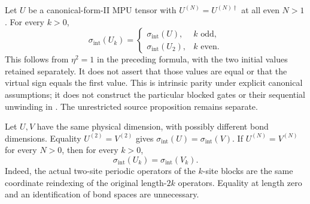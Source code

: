 \begin{lemma}
    \label{lem:mpu_canonical_intrinsic_blocking_parity}
    \leanok
    Let $U$ be a canonical-form-II MPU tensor with
    $U^{(N)}=U^{(N)\dagger}$ at all even $N>1$. For every $k>0$,
    \[
        \sigma_{\mathrm{int}}(U_k)=
        \begin{cases}
            \sigma_{\mathrm{int}}(U),   & k\text{ odd},  \\
            \sigma_{\mathrm{int}}(U_2), & k\text{ even}.
        \end{cases}
    \]
    This follows from $\eta^2=1$ in the preceding formula, with the two
    initial values retained separately. It does not assert that those
    values are equal or that the virtual sign equals the first value.
    This is intrinsic parity under explicit canonical assumptions; it does
    not construct the particular blocked gates or their sequential
    unwinding in \cite[lines~1643--1733]{Cirac2017MPU}. The unrestricted
    source proposition remains separate.
\end{lemma}

\begin{lemma}
    \label{lem:mpu_intrinsic_blocked_trace_representative}
    \leanok
    Let $U,V$ have the same physical dimension, with possibly different bond
    dimensions. Equality $U^{(2)}=V^{(2)}$ gives
    $\sigma_{\mathrm{int}}(U)=\sigma_{\mathrm{int}}(V)$.
    If $U^{(N)}=V^{(N)}$ for every $N>0$, then for every $k>0$,
    \[
        \sigma_{\mathrm{int}}(U_k)=\sigma_{\mathrm{int}}(V_k).
    \]
    Indeed, the actual two-site periodic operators of the $k$-site blocks
    are the same coordinate reindexing of the original length-$2k$ operators.
    Equality at length zero and an identification of bond spaces are unnecessary.
\end{lemma}

